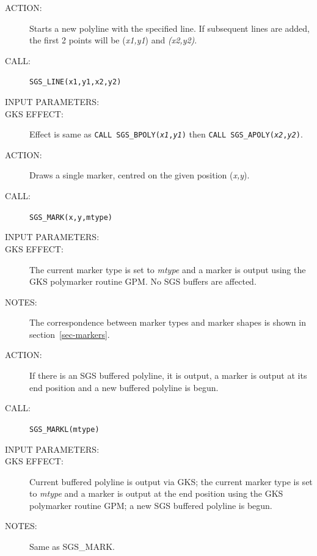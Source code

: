 \documentclass[11pt]{article}
\newcommand{\hyperref}[4]{#2\ref{#4}#3}
\begin{document}
\begin{description}
\item [ACTION:]
Starts a new polyline with the specified line.
If subsequent lines are added, the first 2 points will be ({\em x1,y1}) and
{\em (x2,y2)}.
\item [CALL:]
{\tt SGS\_LINE(x1,y1,x2,y2)}
\item [INPUT PARAMETERS:]
\begin{params}
\end{params}
\item [GKS EFFECT:]
Effect is same as {\tt CALL SGS\_BPOLY({\em x1},{\em y1})} then {\tt CALL
SGS\_APOLY({\em x2},{\em y2})}.
\end{description}
\goodbreak

\begin{description}
\item [ACTION:]
Draws a single marker, centred on the given position ({\em x,y}).
\item [CALL:]
{\tt SGS\_MARK(x,y,mtype)}
\item [INPUT PARAMETERS:]
\begin{params}
\end{params}
\item [GKS EFFECT:]
The current marker type is set to {\em mtype}\/ and a marker is output using the
GKS polymarker routine GPM.
No SGS buffers are affected.
\item [NOTES:]
The correspondence between marker types and marker shapes is shown in
\hyperref{this section}{section~}{}{sec-markers}.
\end{description}
\goodbreak

\begin{description}
\item [ACTION:]
If there is an SGS buffered polyline, it is output, a marker is output at its
end position and a new buffered polyline is begun.
\item [CALL:]
{\tt SGS\_MARKL(mtype)}
\item [INPUT PARAMETERS:]
\begin{params}
\end{params}
\item [GKS EFFECT:]
Current buffered polyline is output via GKS; the current marker type is set to
{\em mtype}\/ and a marker is output at the end position using the GKS polymarker
routine GPM; a new SGS buffered polyline is begun.
\item [NOTES:]
Same as SGS\_MARK.
\end{description}
\goodbreak
\end{document}
